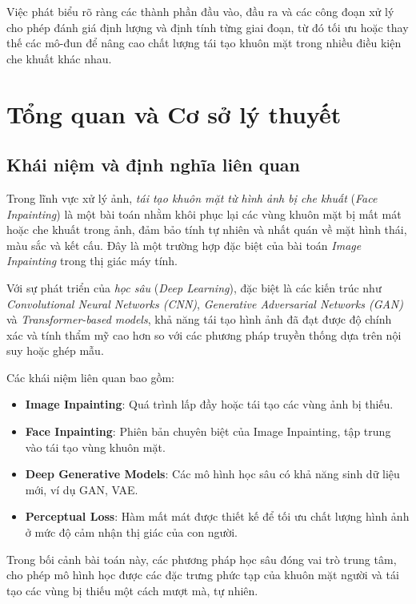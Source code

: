 \documentclass[12pt,a4paper]{article}
\begin{document}
	Việc phát biểu rõ ràng các thành phần đầu vào, đầu ra và các công đoạn xử lý cho phép đánh giá định lượng và định tính từng giai đoạn, từ đó tối ưu hoặc thay thế các mô-đun để nâng cao chất lượng tái tạo khuôn mặt trong nhiều điều kiện che khuất khác nhau.
	\section{Tổng quan và Cơ sở lý thuyết}
	\subsection{Khái niệm và định nghĩa liên quan}
	Trong lĩnh vực xử lý ảnh, \textit{tái tạo khuôn mặt từ hình ảnh bị che khuất} (\textit{Face Inpainting}) là một bài toán nhằm khôi phục lại các vùng khuôn mặt bị mất mát hoặc che khuất trong ảnh, đảm bảo tính tự nhiên và nhất quán về mặt hình thái, màu sắc và kết cấu. Đây là một trường hợp đặc biệt của bài toán \textit{Image Inpainting} trong thị giác máy tính.
	
	Với sự phát triển của \textit{học sâu} (\textit{Deep Learning}), đặc biệt là các kiến trúc như \textit{Convolutional Neural Networks (CNN)}, \textit{Generative Adversarial Networks (GAN)} và \textit{Transformer-based models}, khả năng tái tạo hình ảnh đã đạt được độ chính xác và tính thẩm mỹ cao hơn so với các phương pháp truyền thống dựa trên nội suy hoặc ghép mẫu.
	
	Các khái niệm liên quan bao gồm:
	\begin{itemize}
		\item \textbf{Image Inpainting}: Quá trình lấp đầy hoặc tái tạo các vùng ảnh bị thiếu.
		\item \textbf{Face Inpainting}: Phiên bản chuyên biệt của Image Inpainting, tập trung vào tái tạo vùng khuôn mặt.
		\item \textbf{Deep Generative Models}: Các mô hình học sâu có khả năng sinh dữ liệu mới, ví dụ GAN, VAE.
		\item \textbf{Perceptual Loss}: Hàm mất mát được thiết kế để tối ưu chất lượng hình ảnh ở mức độ cảm nhận thị giác của con người.
	\end{itemize}
	
	Trong bối cảnh bài toán này, các phương pháp học sâu đóng vai trò trung tâm, cho phép mô hình học được các đặc trưng phức tạp của khuôn mặt người và tái tạo các vùng bị thiếu một cách mượt mà, tự nhiên.
	
\end{document}
